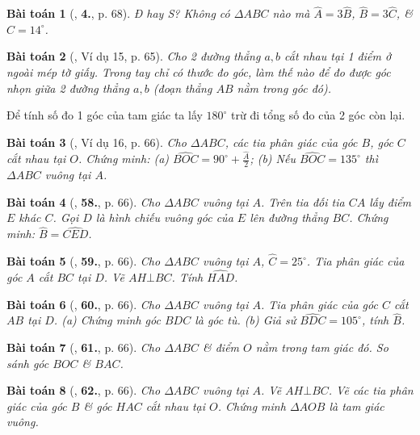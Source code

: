\documentclass{article}
\numberwithin{equation}{section}
\newtheorem{baitoan}{Bài toán}
\begin{document}
\begin{baitoan}[\cite{SBT_Toan_7_Canh_Dieu_tap_2}, \textbf{4.}, p. 68]
	Đ hay S? Không có $\Delta ABC$ nào mà $\widehat{A} = 3\widehat{B}$, $\widehat{B} = 3\widehat{C}$, \& $C = 14^\circ$.
\end{baitoan}

\begin{baitoan}[\cite{Tuyen_Toan_7}, Ví dụ 15, p. 65]
	Cho 2 đường thẳng $a,b$ cắt nhau tại 1 điểm ở ngoài mép tờ giấy. Trong tay chỉ có thước đo góc, làm thế nào để đo được góc nhọn giữa 2 đường thẳng $a,b$ (đoạn thẳng $AB$ nằm trong góc đó).
\end{baitoan}
Để tính số đo 1 góc của tam giác ta lấy $180^\circ$ trừ đi tổng số đo của 2 góc còn lại.

\begin{baitoan}[\cite{Tuyen_Toan_7}, Ví dụ 16, p. 66]
	Cho $\Delta ABC$, các tia phân giác của góc $B$, góc $C$ cắt nhau tại $O$. Chứng minh: (a) $\widehat{BOC} = 90^\circ + \frac{\widehat{A}}{2}$; (b) Nếu $\widehat{BOC} = 135^\circ$ thì $\Delta ABC$ vuông tại $A$.
\end{baitoan}

\begin{baitoan}[\cite{Tuyen_Toan_7}, \textbf{58.}, p. 66]
	Cho $\Delta ABC$ vuông tại $A$. Trên tia đối tia $CA$ lấy điểm $E$ khác $C$. Gọi $D$ là hình chiếu vuông góc của $E$ lên đường thẳng $BC$. Chứng minh: $\widehat{B} = \widehat{CED}$.
\end{baitoan}

\begin{baitoan}[\cite{Tuyen_Toan_7}, \textbf{59.}, p. 66]
	Cho $\Delta ABC$ vuông tại $A$, $\widehat{C} = 25^\circ$. Tia phân giác của góc $A$ cắt $BC$ tại $D$. Vẽ $AH\bot BC$. Tính $\widehat{HAD}$.
\end{baitoan}

\begin{baitoan}[\cite{Tuyen_Toan_7}, \textbf{60.}, p. 66]
	Cho $\Delta ABC$ vuông tại $A$. Tia phân giác của góc $C$ cắt $AB$ tại $D$. (a) Chứng minh góc $BDC$ là góc tù. (b) Giả sử $\widehat{BDC} = 105^\circ$, tính $\widehat{B}$.
\end{baitoan}

\begin{baitoan}[\cite{Tuyen_Toan_7}, \textbf{61.}, p. 66]
	Cho $\Delta ABC$ \& điểm $O$ nằm trong tam giác đó. So sánh góc $BOC$ \& $BAC$.
\end{baitoan}

\begin{baitoan}[\cite{Tuyen_Toan_7}, \textbf{62.}, p. 66]
	Cho $\Delta ABC$ vuông tại $A$. Vẽ $AH\bot BC$. Vẽ các tia phân giác của góc $B$ \& góc $HAC$ cắt nhau tại $O$. Chứng minh $\Delta AOB$ là tam giác vuông.
\end{baitoan}
\end{document}
